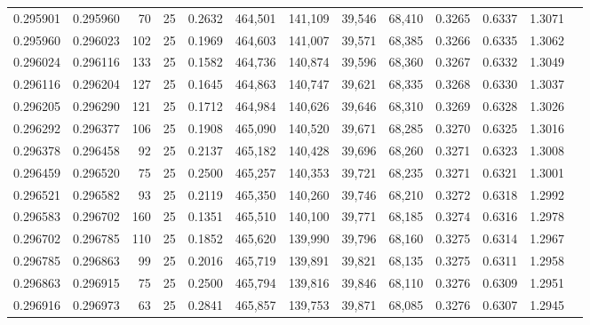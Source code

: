 \begin{tabular}{rrrrrrrrrrrrr}
0.295901 & 0.295960 &    70 &  25 &                                     0.2632 & 464,501 & 141,109 &  39,546 &  68,410 & 0.3265 & 0.6337 & 1.3071 \\
0.295960 & 0.296023 &   102 &  25 &                                     0.1969 & 464,603 & 141,007 &  39,571 &  68,385 & 0.3266 & 0.6335 & 1.3062 \\
0.296024 & 0.296116 &   133 &  25 &                                     0.1582 & 464,736 & 140,874 &  39,596 &  68,360 & 0.3267 & 0.6332 & 1.3049 \\
0.296116 & 0.296204 &   127 &  25 &                                     0.1645 & 464,863 & 140,747 &  39,621 &  68,335 & 0.3268 & 0.6330 & 1.3037 \\
0.296205 & 0.296290 &   121 &  25 &                                     0.1712 & 464,984 & 140,626 &  39,646 &  68,310 & 0.3269 & 0.6328 & 1.3026 \\
0.296292 & 0.296377 &   106 &  25 &                                     0.1908 & 465,090 & 140,520 &  39,671 &  68,285 & 0.3270 & 0.6325 & 1.3016 \\
0.296378 & 0.296458 &    92 &  25 &                                     0.2137 & 465,182 & 140,428 &  39,696 &  68,260 & 0.3271 & 0.6323 & 1.3008 \\
0.296459 & 0.296520 &    75 &  25 &                                     0.2500 & 465,257 & 140,353 &  39,721 &  68,235 & 0.3271 & 0.6321 & 1.3001 \\
0.296521 & 0.296582 &    93 &  25 &                                     0.2119 & 465,350 & 140,260 &  39,746 &  68,210 & 0.3272 & 0.6318 & 1.2992 \\
0.296583 & 0.296702 &   160 &  25 &                                     0.1351 & 465,510 & 140,100 &  39,771 &  68,185 & 0.3274 & 0.6316 & 1.2978 \\
0.296702 & 0.296785 &   110 &  25 &                                     0.1852 & 465,620 & 139,990 &  39,796 &  68,160 & 0.3275 & 0.6314 & 1.2967 \\
0.296785 & 0.296863 &    99 &  25 &                                     0.2016 & 465,719 & 139,891 &  39,821 &  68,135 & 0.3275 & 0.6311 & 1.2958 \\
0.296863 & 0.296915 &    75 &  25 &                                     0.2500 & 465,794 & 139,816 &  39,846 &  68,110 & 0.3276 & 0.6309 & 1.2951 \\
0.296916 & 0.296973 &    63 &  25 &                                     0.2841 & 465,857 & 139,753 &  39,871 &  68,085 & 0.3276 & 0.6307 & 1.2945 \\

\end{tabular}

